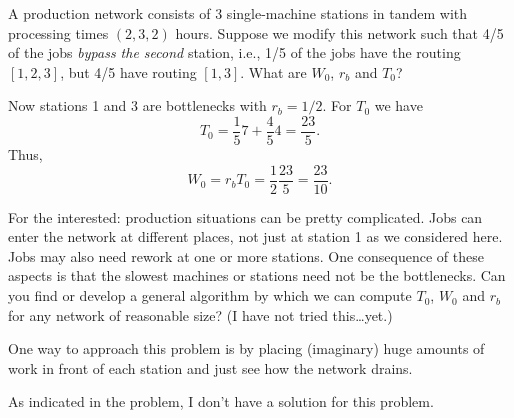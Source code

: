 \begin{question}
  A production network consists of 3 single-machine stations in tandem
  with processing times $(2, 3, 2)$ hours.  Suppose we modify this
  network such that 4/5 of the jobs \emph{bypass the second} station,
  i.e., 1/5 of the jobs have the routing $[1,2,3]$, but 4/5 have
  routing $[1,3]$.  What are $W_0$, $r_b$ and $T_0$?
\end{question}
\begin{solution}
  Now stations 1 and 3 are bottlenecks with $r_b = 1/2$. For $T_0$ we have
  \begin{equation*}
    T_0 = \frac15 7 + \frac45 4= \frac{23}5.
  \end{equation*}
Thus, 
\begin{equation*}
W_0 = r_b T_0 = \frac 12 \frac{23}5 = \frac{23}{10}.
\end{equation*}
\end{solution}




\begin{question}
  For the interested: production situations can be pretty
  complicated. Jobs can enter the network at different places, not
  just at station 1 as we considered here. Jobs may also need rework
  at one or more stations. One consequence of these aspects is that
  the slowest machines or stations need not be the bottlenecks. Can
  you find or develop a general algorithm by which we can compute
  $T_0$, $W_0$ and $r_b$ for any network of reasonable size? (I have
  not tried this\ldots yet.) 

  One way to approach this problem is by placing (imaginary) huge
  amounts of work in front of each station and just see how the network drains. 
  \begin{solution}
    As indicated in the problem, I don't have a solution for this
    problem.
  \end{solution}

\end{question}

